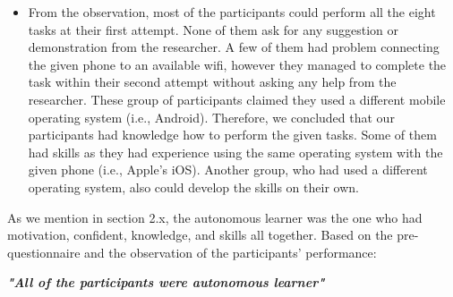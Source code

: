 \begin{itemize}
\newpage
\item From the observation, most of the participants could perform all the eight tasks at their first attempt. None of them ask for any suggestion or demonstration from the researcher. A few of them had problem connecting the given phone to an available wifi, however they managed to complete the task within their second attempt without asking any help from the researcher. These group of participants claimed they used a different mobile operating system (i.e., Android). 
\newline
\newline \noindent Therefore, we concluded that our participants had knowledge how to perform the given tasks. Some of them had skills as they had experience using the same operating system with the given phone (i.e., Apple's iOS). Another group, who had used a different operating system, also could develop the skills on their own. 
\end{itemize}

As we mention in section 2.x, the autonomous learner was the one who had motivation, confident, knowledge, and skills all together. Based on the pre-questionnaire and the observation of the participants' performance: 
\newline 
\begin{addmargin}[1.5em]{1.5em}
\textit{\textbf{"All of the participants were autonomous learner"}}
\end{addmargin}



